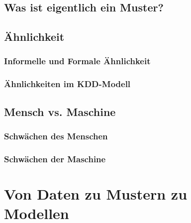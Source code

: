         \subsection{Was ist eigentlich ein Muster?} %

        \subsection{Ähnlichkeit} %

            \subsubsection{Informelle und Formale Ähnlichkeit} %

            \subsubsection{Ähnlichkeiten im KDD-Modell} %

        \subsection{Mensch vs. Maschine} %

            \subsubsection{Schwächen des Menschen} %

            \subsubsection{Schwächen der Maschine} %

    \section{Von Daten zu Mustern zu Modellen} %

